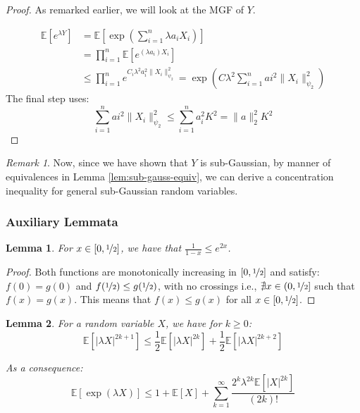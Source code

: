 \documentclass{article}
\newtheorem{lemma}{Lemma}[subsection]
\theoremstyle{remark}
\newtheorem*{remark}{Remark}
\newcommand{\Exp}{\mathbb{E}}
\begin{document}
\begin{proof}
As remarked earlier, we will look at the MGF of \(Y\).

\begin{align*}
\Exp\left[e^{\lambda Y}\right] &= \Exp\left[\exp\left(\sum_{i=1}^{n} \lambda a_{i}X_{i}\right)\right] \\
&= \prod_{i=1}^{n}\Exp\left[e^{(\lambda a_{i})X_{i}}\right] \\
&\leq \prod_{i=1}^{n}e^{C_{i}\lambda^{2}a_{i}^{2}\|X_{i}\|_{\psi_{2}}^{2}} = \exp\left(C\lambda^{2}\sum_{i=1}^{n}a{i}^{2}\|X_{i}\|^{2}_{\psi_{2}}\right)
\end{align*}
The final step uses:
\begin{equation*}
\sum_{i=1}^{n}a{i}^{2}\|X_{i}\|^{2}_{\psi_{2}} \leq \sum_{i=1}^{n}a_{i}^{2}K^{2} = \|a\|_{2}^{2}K^{2}
\end{equation*}
\end{proof}

\begin{remark}
Now, since we have shown that \(Y\) is sub-Gaussian, by manner of equivalences in Lemma \ref{lem:sub-gauss-equiv}, we can derive a concentration inequality for general sub-Gaussian random variables.
\end{remark}

\subsubsection{Auxiliary Lemmata}
\begin{lemma}
\label{lem:geometric-series-exponential}
For \(x \in [0, \nicefrac{1}{2}]\), we have that \(\frac{1}{1 - x} \leq e^{2x}\).
\end{lemma}

\begin{proof}
Both functions are monotonically increasing in \([0, \nicefrac{1}{2}]\) and satisfy: \(f(0) = g(0)\) and \(f(\nicefrac{1}{2}) \leq g(\nicefrac{1}{2})\), with no crossings i.e., \(\nexists x \in (0, \nicefrac{1}{2}]\) such that \(f(x) = g(x)\). This means that \(f(x) \leq g(x)\) for all \(x \in [0, \nicefrac{1}{2}]\).
\end{proof}

\begin{lemma}
\label{lem:odd-even-moments}
For a random variable \(X\), we have for \(k \geq 0\):
\begin{equation*}
\Exp[|\lambda X|^{2k + 1}] \leq \frac{1}{2}\Exp[|\lambda X|^{2k}] + \frac{1}{2}\Exp[|\lambda X|^{2k + 2}]
\end{equation*}

As a consequence:
\begin{equation*}
\Exp[\exp(\lambda X)] \leq 1 + \Exp[X] + \sum_{k=1}^{\infty}\frac{2^{k}\lambda^{2k}\Exp[|X|^{2k}]}{(2k)!}
\end{equation*}
\end{lemma}
\end{document}
